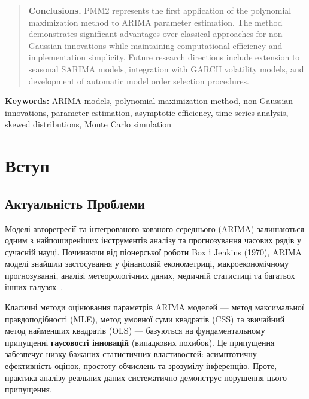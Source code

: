 \documentclass[12pt,a4paper]{article}
\begin{document}
\begin{abstract}
\textbf{Conclusions.} PMM2 represents the first application of the polynomial maximization method to ARIMA parameter estimation. The method demonstrates significant advantages over classical approaches for non-Gaussian innovations while maintaining computational efficiency and implementation simplicity. Future research directions include extension to seasonal SARIMA models, integration with GARCH volatility models, and development of automatic model order selection procedures.

\end{abstract}

\noindent\textbf{Keywords:} ARIMA models, polynomial maximization method, non-Gaussian innovations, parameter estimation, asymptotic efficiency, time series analysis, skewed distributions, Monte Carlo simulation


\newpage
\tableofcontents
\newpage

\section{Вступ}
\label{sec:introduction}

\subsection{Актуальність Проблеми}
\label{subsec:motivation}

Моделі авторегресії та інтегрованого ковзного середнього (ARIMA) залишаються одним з найпоширеніших інструментів аналізу та прогнозування часових рядів у сучасній науці. Починаючи від піонерської роботи Box і Jenkins (1970), ARIMA моделі знайшли застосування у фінансовій економетриці, макроекономічному прогнозуванні, аналізі метеорологічних даних, медичній статистиці та багатьох інших галузях~\cite{box2015time,hyndman2021forecasting}.

Класичні методи оцінювання параметрів ARIMA моделей --- метод максимальної правдоподібності (MLE), метод умовної суми квадратів (CSS) та звичайний метод найменших квадратів (OLS) --- базуються на фундаментальному припущенні \textbf{гаусовості інновацій} (випадкових похибок). Це припущення забезпечує низку бажаних статистичних властивостей: асимптотичну ефективність оцінок, простоту обчислень та зрозумілу інференцію. Проте, практика аналізу реальних даних систематично демонструє порушення цього припущення.
\end{document}
